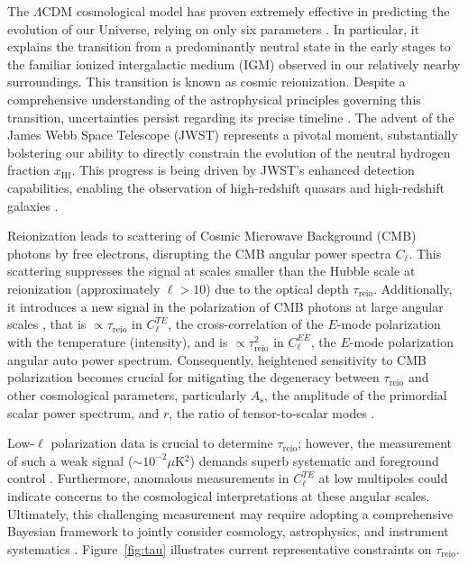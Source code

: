 \documentclass[12pt]{article}
\newcommand{\As}{A_\mathrm{s}}
\newcommand{\HI}{\mathrm{HI}}
\newcommand{\reio}{\mathrm{reio}}
\begin{document}
\noindent  %
The $\Lambda$CDM cosmological model has proven extremely effective in
predicting the evolution of our Universe, relying on only six parameters
\cite{Planck2020a}.
In particular, it explains the transition from a predominantly neutral
state in the early stages to the familiar ionized intergalactic medium
(IGM) observed in our relatively nearby surroundings.
This transition is known as cosmic reionization.
Despite a comprehensive understanding of the astrophysical principles
governing this transition, uncertainties persist regarding its precise
timeline \cite{Jin2023}.
The advent of the James Webb Space Telescope (JWST) \cite{Gardner2006}
represents a pivotal moment, substantially bolstering our ability to
directly constrain the evolution of the neutral hydrogen fraction
$x_\HI$.
This progress is being driven by JWST's enhanced detection capabilities,
enabling the observation of high-redshift quasars \cite{Eilers2023} and
high-redshift galaxies \cite{Adams2023, Bradley2023, Donnan2023,
Ning2024}.

Reionization leads to scattering of Cosmic Microwave Background (CMB)
photons by free electrons, disrupting the CMB angular power spectra
$C_\ell$.
This scattering suppresses the signal at scales smaller than the Hubble
scale at reionization (approximately $\ell>10$) \cite{Planck2020b} due
to the optical depth $\tau_\reio$.
Additionally, it introduces a new signal in the polarization of CMB
photons at large angular scales \cite{Planck2020a}, that is $\propto
\tau_\reio$ in $C^{TE}_\ell$, the cross-correlation of the $E$-mode
polarization with the temperature (intensity), and is $\propto
\tau_\reio^2$ in $C^{EE}_\ell$, the $E$-mode polarization angular auto
power spectrum.
Consequently, heightened sensitivity to CMB polarization becomes crucial
for mitigating the degeneracy between $\tau_\reio$ and other
cosmological parameters, particularly $\As$, the amplitude of the
primordial scalar power spectrum, and $r$, the ratio of tensor-to-scalar
modes \cite{Natale2020}.

Low-$\ell$ polarization data is crucial to determine $\tau_\reio$;
however, the measurement of such a weak signal ($\sim 10^{-2} \mu$K$^2$)
demands superb systematic and foreground control \cite{Planck2020b}.
Furthermore, anomalous measurements in $C^{TE}_\ell$ at low multipoles
\cite{Planck2020a} could indicate concerns to the cosmological
interpretations at these angular scales.
Ultimately, this challenging measurement may require adopting a
comprehensive Bayesian framework to jointly consider cosmology,
astrophysics, and instrument systematics \cite{Paradiso2023}.
Figure~\ref{fig:tau} illustrates current representative constraints on
$\tau_\reio$.
\end{document}
